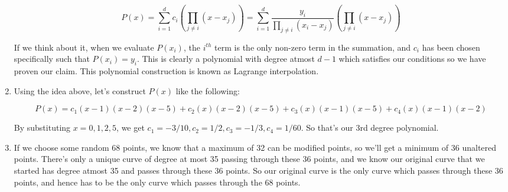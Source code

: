 \documentclass[12pt]{report}
\begin{document}
\begin{enumerate}[label=\textbf{\arabic*.}]
    \[P(x) = \sum_{i=1}^d c_i \left(\prod_{j \neq i} (x - x_j)\right) = \sum_{i=1}^d \frac{y_i}{\prod_{j \neq i} (x_i - x_j)} \left(\prod_{j \neq i} (x - x_j)\right) \]

    If we think about it, when we evaluate $P(x_i)$, the $i^{th}$ term is the only non-zero term in the summation, and $c_i$ has been 
    chosen specifically such that $P(x_i) = y_i$. This is clearly a polynomial with degree atmost $d-1$ which satisfies our conditions
    so we have proven our claim. This polynomial construction is known as Lagrange interpolation.
    
    \item Using the idea above, let's construct $P(x)$ like the following:

    \[ P(x) = c_1(x-1)(x-2)(x-5) + c_2(x)(x-2)(x-5)+ c_3(x)(x-1)(x-5) + c_4(x)(x-1)(x-2) \]

    By substituting $x = 0,1,2,5$, we get $c_1 = -3/10, c_2 = 1/2, c_3 = -1/3, c_4 = 1/60$. So that's our 3rd degree polynomial.

    \item If we choose some random 68 points, we know that a maximum of 32 can be modified points, so we'll get a minimum of 36 unaltered 
    points. There's only a unique curve of degree at most 35 passing through these 36 points, and we know our original curve that 
    we started has degree atmost 35 and passes through these 36 points. So our original curve is the only curve which passes 
    through these 36 points, and hence has to be the only curve which passes through the 68 points.
    
\end{enumerate}
\end{document}
